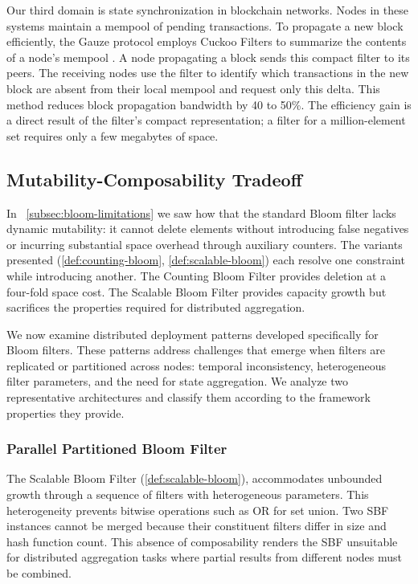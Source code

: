Our third domain is state synchronization in blockchain networks. Nodes in these systems maintain a mempool of pending transactions. To propagate a new block efficiently, the Gauze protocol employs Cuckoo Filters to summarize the contents of a node's mempool \cite{ding2023gauze}. A node propagating a block sends this compact filter to its peers. The receiving nodes use the filter to identify which transactions in the new block are absent from their local mempool and request only this delta. This method reduces block propagation bandwidth by 40 to 50\%. The efficiency gain is a direct result of the filter's compact representation; a filter for a million-element set requires only a few megabytes of space.

\subsection{Mutability-Composability Tradeoff}

In ~\ref{subsec:bloom-limitations} we saw how that the standard Bloom filter lacks dynamic mutability: it cannot delete elements without introducing false negatives or incurring substantial space overhead through auxiliary counters. The variants presented (\ref{def:counting-bloom}, \ref{def:scalable-bloom}) each resolve one constraint while introducing another. The Counting Bloom Filter provides deletion at a four-fold space cost. The Scalable Bloom Filter provides capacity growth but sacrifices the properties required for distributed aggregation.

We now examine distributed deployment patterns developed specifically for Bloom filters. These patterns address challenges that emerge when filters are replicated or partitioned across nodes: temporal inconsistency, heterogeneous filter parameters, and the need for state aggregation. We analyze two representative architectures and classify them according to the framework properties they provide.

\subsubsection{Parallel Partitioned Bloom Filter}

The Scalable Bloom Filter (\ref{def:scalable-bloom}), accommodates unbounded growth through a sequence of filters with heterogeneous parameters. This heterogeneity prevents bitwise operations such as OR for set union. Two SBF instances cannot be merged because their constituent filters differ in size and hash function count. This absence of composability renders the SBF unsuitable for distributed aggregation tasks where partial results from different nodes must be combined.

